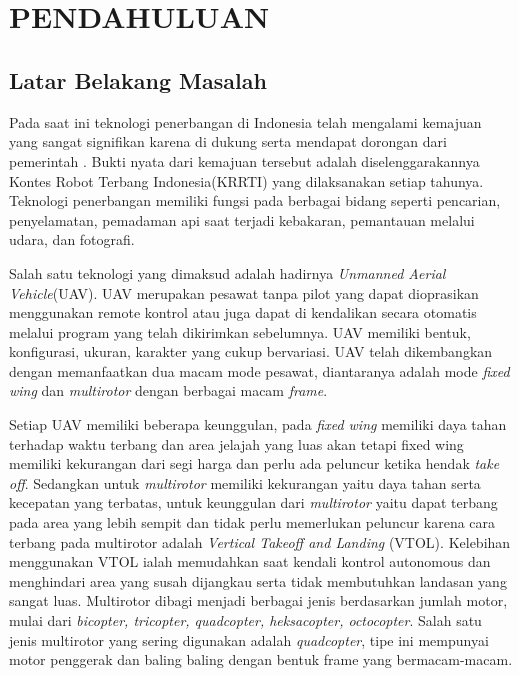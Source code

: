 
\chapter[PENDAHULUAN]{\\ PENDAHULUAN}

\section{Latar Belakang Masalah}
Pada saat ini teknologi penerbangan di Indonesia telah mengalami kemajuan yang sangat signifikan karena di dukung serta mendapat dorongan dari pemerintah \cite{ashari2021desain}. Bukti nyata dari kemajuan tersebut adalah diselenggarakannya Kontes Robot Terbang Indonesia(KRRTI) yang dilaksanakan setiap tahunya\cite{abbiyansyah2022navigasi}. Teknologi penerbangan memiliki fungsi pada berbagai bidang seperti pencarian, penyelamatan, pemadaman api saat terjadi kebakaran, pemantauan melalui udara, dan fotografi\cite{suprapto2017design}\cite{d2012unmanned}\cite{belloni2008mini}. 

Salah satu teknologi yang dimaksud adalah hadirnya\textit{ Unmanned Aerial Vehicle}(UAV). UAV merupakan pesawat tanpa pilot yang dapat dioprasikan menggunakan remote kontrol atau juga dapat di kendalikan secara otomatis melalui program yang telah dikirimkan sebelumnya. UAV memiliki bentuk, konfigurasi, ukuran, karakter yang cukup bervariasi. UAV telah dikembangkan dengan memanfaatkan dua macam mode pesawat, diantaranya adalah mode \textit{fixed wing} dan \textit{multirotor} dengan berbagai macam \textit{frame}\cite{afifahrancang}. 

Setiap UAV memiliki beberapa keunggulan, pada \textit{fixed wing} memiliki daya tahan terhadap waktu terbang dan area jelajah yang luas akan tetapi fixed wing memiliki kekurangan dari segi harga dan perlu ada peluncur ketika hendak \textit{take off}. Sedangkan untuk \textit{multirotor} memiliki kekurangan yaitu daya tahan serta kecepatan yang terbatas, untuk keunggulan dari \textit{multirotor} yaitu dapat terbang pada area yang lebih sempit dan tidak perlu memerlukan peluncur karena cara terbang pada multirotor adalah \textit{Vertical Takeoff and Landing} (VTOL)\cite{wahyudinjurusan}. Kelebihan menggunakan VTOL ialah memudahkan saat kendali kontrol autonomous dan menghindari area yang susah dijangkau serta tidak membutuhkan landasan yang sangat luas. Multirotor dibagi menjadi berbagai jenis berdasarkan jumlah motor, mulai dari \textit{bicopter, tricopter, quadcopter, heksacopter, octocopter}. Salah satu jenis multirotor yang sering digunakan adalah \textit{quadcopter}, tipe ini mempunyai motor penggerak dan baling baling dengan bentuk frame yang bermacam-macam. 

